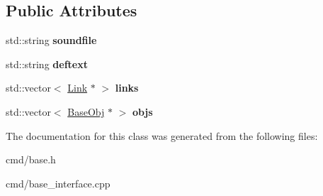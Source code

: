 \subsection*{Public Attributes}
\begin{DoxyCompactItemize}
\item 
std\+::string {\bfseries soundfile}\hypertarget{classBaseInterface_1_1Room_a3990938fa84fa67c89278bf270094708}{}\label{classBaseInterface_1_1Room_a3990938fa84fa67c89278bf270094708}

\item 
std\+::string {\bfseries deftext}\hypertarget{classBaseInterface_1_1Room_a3f2122c9567f82be70f825a388e69d48}{}\label{classBaseInterface_1_1Room_a3f2122c9567f82be70f825a388e69d48}

\item 
std\+::vector$<$ \hyperlink{classBaseInterface_1_1Room_1_1Link}{Link} $\ast$ $>$ {\bfseries links}\hypertarget{classBaseInterface_1_1Room_a4d289c0858a8ee22eb4d738ec4544c1c}{}\label{classBaseInterface_1_1Room_a4d289c0858a8ee22eb4d738ec4544c1c}

\item 
std\+::vector$<$ \hyperlink{classBaseInterface_1_1Room_1_1BaseObj}{Base\+Obj} $\ast$ $>$ {\bfseries objs}\hypertarget{classBaseInterface_1_1Room_a6638487a6a2fd35c010d47b8708bb8b6}{}\label{classBaseInterface_1_1Room_a6638487a6a2fd35c010d47b8708bb8b6}

\end{DoxyCompactItemize}


The documentation for this class was generated from the following files\+:\begin{DoxyCompactItemize}
\item 
cmd/base.\+h\item 
cmd/base\+\_\+interface.\+cpp\end{DoxyCompactItemize}
